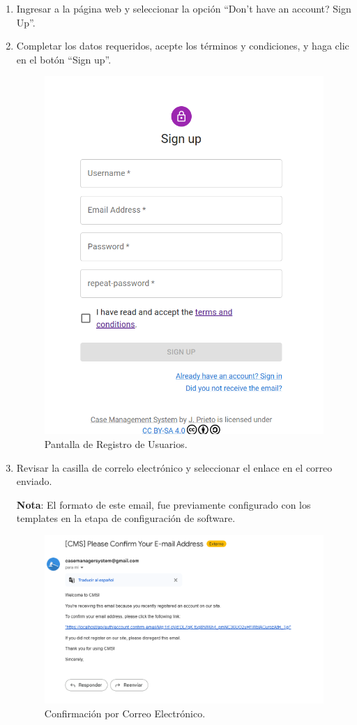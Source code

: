 \begin{enumerate}
    \item Ingresar a la página web y seleccionar la opción ``Don't have an account? Sign Up''.
    \item Completar los datos requeridos, acepte los términos y condiciones, y haga clic en el botón ``Sign up''.


    \begin{figure}[H]
        \centering
        \includegraphics[width=0.7\linewidth]{fig/signup.png}
        \caption{Pantalla de Registro de Usuarios.}
        \label{fig:signup}
    \end{figure}

    \item Revisar la casilla de correlo electrónico y seleccionar el enlace en el correo enviado.

    \textbf{Nota}: El formato de este email, fue previamente configurado con los templates en la etapa de configuración de software.

    \begin{figure}[H]
        \centering
        \includegraphics[width=1\linewidth]{fig/confirm-email.png}
        \caption{Confirmación por Correo Electrónico.}
        \label{fig:confirm-email}
    \end{figure}
\end{enumerate}
